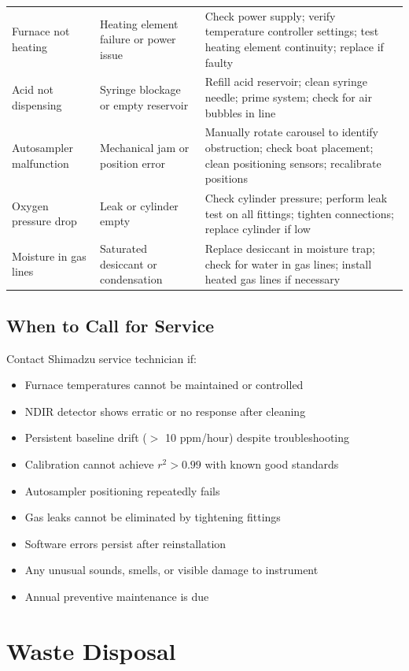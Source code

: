 \documentclass[11pt,a4paper]{article}\usepackage[]{graphicx}\usepackage[]{xcolor}
\begin{document}
\begin{longtable}{p{3.5cm}p{4cm}p{6.5cm}}
Furnace not heating & Heating element failure or power issue & Check power supply; verify temperature controller settings; test heating element continuity; replace if faulty \\
Acid not dispensing & Syringe blockage or empty reservoir & Refill acid reservoir; clean syringe needle; prime system; check for air bubbles in line \\
Autosampler malfunction & Mechanical jam or position error & Manually rotate carousel to identify obstruction; check boat placement; clean positioning sensors; recalibrate positions \\
Oxygen pressure drop & Leak or cylinder empty & Check cylinder pressure; perform leak test on all fittings; tighten connections; replace cylinder if low \\
Moisture in gas lines & Saturated desiccant or condensation & Replace desiccant in moisture trap; check for water in gas lines; install heated gas lines if necessary \\
\end{longtable}

\subsection{When to Call for Service}

Contact Shimadzu service technician if:

\begin{itemize}[noitemsep]
    \item Furnace temperatures cannot be maintained or controlled
    \item NDIR detector shows erratic or no response after cleaning
    \item Persistent baseline drift ($>$ 10 ppm/hour) despite troubleshooting
    \item Calibration cannot achieve $r^2 > 0.99$ with known good standards
    \item Autosampler positioning repeatedly fails
    \item Gas leaks cannot be eliminated by tightening fittings
    \item Software errors persist after reinstallation
    \item Any unusual sounds, smells, or visible damage to instrument
    \item Annual preventive maintenance is due
\end{itemize}

\section{Waste Disposal}
\end{document}

